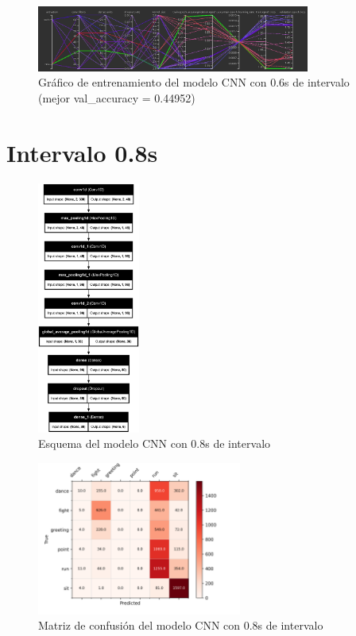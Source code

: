 \begin{figure}[H]
    \centering
    \includegraphics[width=0.8\textwidth]{Imagenes/Bitmap/tb-cnn-0.6.png}
    \caption{Gráfico de entrenamiento del modelo CNN con 0.6s de intervalo (mejor val\_accuracy = 0.44952)}
    \label{fig:cnn-0.6-grafico}
\end{figure}

\section{Intervalo 0.8s}

\begin{figure}[H]
    \centering
    \includegraphics[width=0.3\textwidth]{Imagenes/Bitmap/best-cnn0.8.png}
    \caption{Esquema del modelo CNN con 0.8s de intervalo}
    \label{fig:cnn-0.8-final}
\end{figure}

\begin{figure}[H]
    \centering
    \includegraphics[width=0.6\textwidth]{Imagenes/Bitmap/CM_best-cnn0.8.png}
    \caption{Matriz de confusión del modelo CNN con 0.8s de intervalo}
    \label{fig:cnn-0.8-matriz}
\end{figure}

